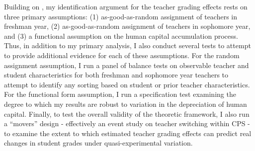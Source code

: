 \documentclass[../thesis_main.tex]{subfiles}
\begin{document}

Building on \citet{gilraineMakingTeachingLast2020}, my identification argument for the teacher grading effects rests on three primary assumptions: (1) as-good-as-random assignment of teachers in freshman year, (2) as-good-as-random assignment of teachers in sophomore year, and (3) a functional assumption on the human capital accumulation process. Thus, in addition to my primary analysis, I also conduct several tests to attempt to provide additional evidence for each of these assumptions. For the random assignment assumption, I run a panel of balance tests on observable teacher and student characteristics for both freshman and sophomore year teachers to attempt to identify any sorting based on student or prior teacher characteristics. For the functional form assumption, I run a specification test examining the degree to which my results are robust to variation in the depreciation of human capital. Finally, to test the overall validity of the theoretic framework, I also run a ``movers'' design - effectively an event study on teacher switching within CPS - to examine the extent to which estimated teacher grading effects can predict real changes in student grades under quasi-experimental variation. 
\end{document}
